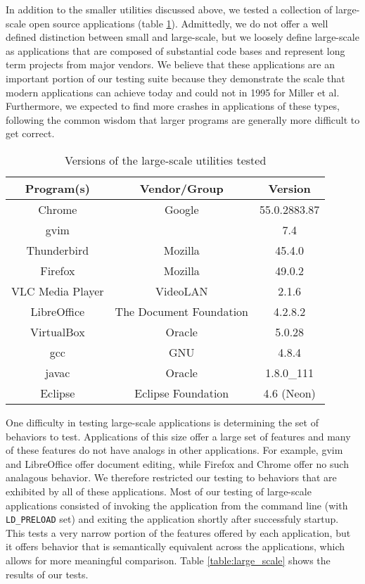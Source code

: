 In addition to the smaller utilities discussed above, we tested a collection of large-scale open source applications (table \ref{tab:large_scale_versions}). Admittedly, we do not offer a well defined distinction between small and large-scale, but we loosely define large-scale as applications that are composed of substantial code bases and represent long term projects from major vendors. We believe that these applications are an important portion of our testing suite because they demonstrate the scale that modern applications can achieve today and could not in 1995 for Miller et al. Furthermore, we expected to find more crashes in applications of these types, following the common wisdom that larger programs are generally more difficult to get correct.

\begin{table}[h!]
\begin{center}
\begin{tabular}{ |c|c|c| }
\hline
\multicolumn{1}{|c|}{\textbf{Program(s)}} & \multicolumn{1}{c|}{\textbf{Vendor/Group}} & \multicolumn{1}{c|}{\textbf{Version}} \\
\hline
Chrome & Google & 55.0.2883.87 \\
gvim & & 7.4 \\
Thunderbird & Mozilla & 45.4.0\\
Firefox & Mozilla & 49.0.2 \\
VLC Media Player &VideoLAN & 2.1.6\\
LibreOffice & The Document Foundation & 4.2.8.2\\
VirtualBox & Oracle & 5.0.28\\
gcc & GNU & 4.8.4\\
javac & Oracle & 1.8.0\_111\\
Eclipse & Eclipse Foundation & 4.6 (Neon) \\
\hline
\end{tabular}
\caption{Versions of the large-scale utilities tested}
\label{tab:large_scale_versions}
\end{center}
\end{table}


One difficulty in testing large-scale applications is determining the set of behaviors to test. Applications of this size offer a large set of features and many of these features do not have analogs in other applications. For example, gvim and LibreOffice offer document editing, while Firefox and Chrome offer no such analagous behavior. We therefore restricted our testing to behaviors that are exhibited by all of these applications. Most of our testing of large-scale applications consisted of invoking the application from the command line (with \texttt{LD\_PRELOAD} set) and exiting the application shortly after successfuly startup. This tests a very narrow portion of the features offered by each application, but it offers behavior that is semantically equivalent across the applications, which allows for more meaningful comparison. Table \ref{table:large_scale} shows the results of our tests.

